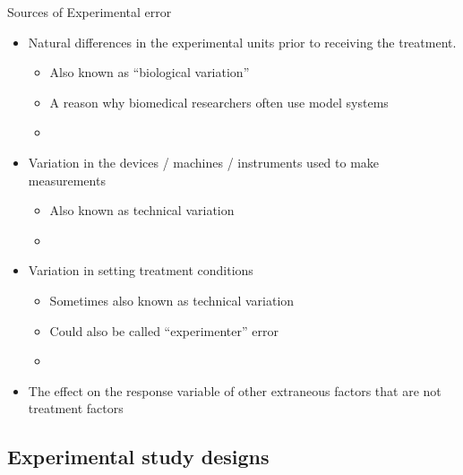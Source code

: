 \documentclass[xcolor=dvipsnames]{beamer}
\begin{document}
\begin{frame}{Sources of Experimental error}
	\begin{itemize}
		\item Natural differences in the experimental units prior to receiving the treatment. \pause
		\begin{itemize}
			\item Also known as ``biological variation'' \pause
			\item A reason why biomedical researchers often use model systems \pause
			\item[]
		\end{itemize}
		\item Variation in the devices / machines / instruments used to make measurements \pause
		\begin{itemize}
			\item Also known as technical variation \pause
			\item[]
		\end{itemize}
		\item Variation in setting treatment conditions \pause
				\begin{itemize}
			\item Sometimes also known as technical variation \pause
			\item Could also be called ``experimenter'' error
			\item[]
		\end{itemize}
	\item The effect on the response variable of other extraneous factors that are not treatment factors
	\end{itemize}
\end{frame}

\subsection{Experimental study designs}
\end{document}
